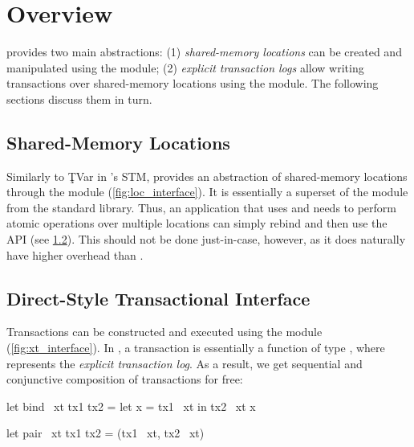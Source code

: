 \section{\Kcas Overview}
\label{sec:overview}

\Kcas provides two main abstractions: (1) \emph{shared-memory locations} can be created and manipulated using the  module; (2) \emph{explicit transaction logs} allow writing transactions over shared-memory locations using the  module.
The following sections discuss them in turn.

\subsection{Shared-Memory Locations}



Similarly to \c{TVar} in \Haskell's STM, \Kcas provides an abstraction of shared-memory locations through the  module (\cref{fig:loc_interface}).
It is essentially a superset of the  module from the standard library.
Thus, an application that uses  and needs to perform atomic operations over multiple locations can simply rebind  and then use the  API (see \cref{sec:overview_xt}).
This should not be done just-in-case, however, as it does naturally have higher overhead than .

\subsection{Direct-Style Transactional Interface}
\label{sec:overview_xt}



Transactions can be constructed and executed using the  module (\cref{fig:xt_interface}).
In \Kcas, a transaction is essentially a function of type , where  represents the \emph{explicit transaction log}.
As a result, we get sequential and conjunctive composition of transactions for free:

\smallskip
\begin{minipage}[t]{.45\textwidth}
\begin{ocamlcode}
let bind ~xt tx1 tx2 =
  let x = tx1 ~xt in tx2 ~xt x
\end{ocamlcode}
\end{minipage}
\hfill
\begin{minipage}[t]{.45\textwidth}
\begin{ocamlcode}
let pair ~xt tx1 tx2 =
  (tx1 ~xt, tx2 ~xt)
\end{ocamlcode}
\end{minipage}
\smallskip

